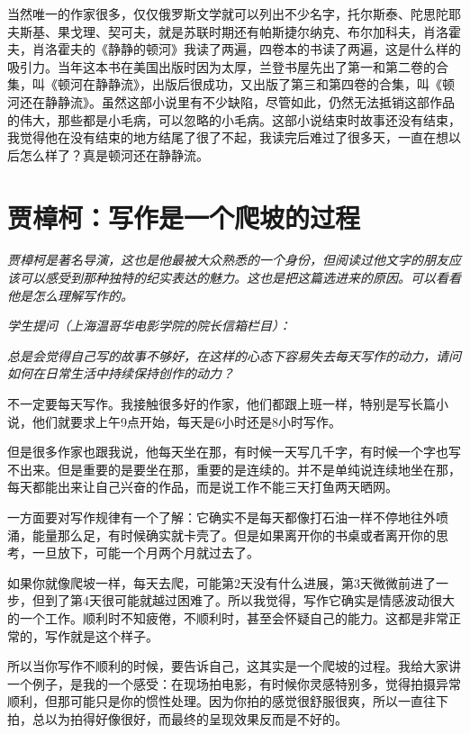 \documentclass[12pt,a5paper]{ctexbook}
\begin{document}
当然唯一的作家很多，仅仅俄罗斯文学就可以列出不少名字，托尔斯泰、陀思陀耶夫斯基、果戈理、契可夫，就是苏联时期还有帕斯捷尔纳克、布尔加科夫，肖洛霍夫，肖洛霍夫的《静静的顿河》我读了两遍，四卷本的书读了两遍，这是什么样的吸引力。当年这本书在美国出版时因为太厚，兰登书屋先出了第一和第二卷的合集，叫《顿河在静静流》，出版后很成功，又出版了第三和第四卷的合集，叫《顿河还在静静流》。虽然这部小说里有不少缺陷，尽管如此，仍然无法抵销这部作品的伟大，那些都是小毛病，可以忽略的小毛病。这部小说结束时故事还没有结束，我觉得他在没有结束的地方结尾了很了不起，我读完后难过了很多天，一直在想以后怎么样了？真是顿河还在静静流。


\newpage

\section{贾樟柯：写作是一个爬坡的过程}

\emph{贾樟柯是著名导演，这也是他最被大众熟悉的一个身份，但阅读过他文字的朋友应该可以感受到那种独特的纪实表达的魅力。这也是把这篇选进来的原因。可以看看他是怎么理解写作的。}
\vspace{2em}


\emph{学生提问（上海温哥华电影学院的院长信箱栏目）：}

\emph{总是会觉得自己写的故事不够好，‍‍在这样的心态下容易失去每天写作的动力，请问如何在日常生活中持续保持创作的动力？}

\vspace{2em}

不一定要每天写作。我接触很多好的作家，他们都跟上班一样，特别是写长篇小说，他们就要求上午9点开始，每天是6小时还是8小时写作。

但是很多作家也跟我说，他每天坐在那，有时候一天写几千字，有时候一个字也写不出来。但是重要的是要坐在那，‍‍重要的是连续的。并不是单纯说连续地坐在那，每天都能出来让自己兴奋的作品，而是说工作不能三天打鱼两天晒网。

一方面要对写作规律有一个了解：它确实不是每天‍‍都像打石油一样不停地往外喷涌，能量那么足，‍‍有时候确实就卡壳了。但是如果离开你的书桌或者离开你的思考，一旦放下，可能‍‍一个月两个月就过去了。

如果你就像爬坡一样，每天去爬，‍‍可能第2天没有什么进展，第3天微微前进了一步，但到了第4天很可能就越过困难了。‍‍所以我觉得，写作它确实是情感波动很大的‍‍一个工作。顺利时不知疲倦，不顺利时，甚至会怀疑自己的能力。这都是非常正常的，写作就是这个样子。

所以当你写作‍‍不顺利的时候，‍‍要告诉自己，这其实是一个爬坡的过程。我给大家讲一个例子，是我的一个感受：在现场拍电影‍‍，有时候你灵感特别多，觉得拍摄异常顺利，但那可能只是你的惯性处理。因为你拍的感觉很舒服很爽，所以一直往下拍，总以为拍得好像很好，而最终的呈现效果反而是不好的。
\end{document}
